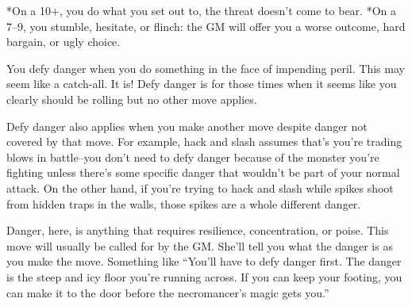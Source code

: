 *On a 10+, you do what you set out to, the threat doesn't come to bear. *On a 7--9, you stumble, hesitate, or flinch: the GM will offer you a worse outcome, hard bargain, or ugly choice.

You defy danger when you do something in the face of impending peril. This may seem like a catch-all. It is! Defy danger is for those times when it seems like you clearly should be rolling but no other move applies.

Defy danger also applies when you make another move despite danger not covered by that move. For example, hack and slash assumes that's you're trading blows in battle--you don't need to defy danger because of the monster you're fighting unless there's some specific danger that wouldn't be part of your normal attack. On the other hand, if you're trying to hack and slash while spikes shoot from hidden traps in the walls, those spikes are a whole different danger.

Danger, here, is anything that requires resilience, concentration, or poise. This move will usually be called for by the GM\@. She'll tell you what the danger is as you make the move. Something like ``You'll have to defy danger first. The danger is the steep and icy floor you're running across. If you can keep your footing, you can make it to the door before the necromancer's magic gets you.''

